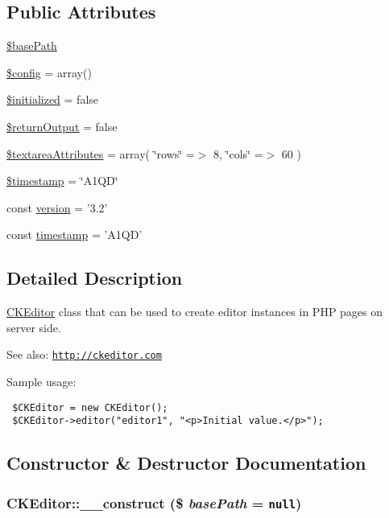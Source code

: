 \subsection*{Public Attributes}
\begin{CompactItemize}
\item 
\hyperlink{classCKEditor_5a276aca7f1883ad38e53e1510846c19}{\$basePath}
\item 
\hyperlink{classCKEditor_54173f65f448c2f1afaade3b6cbe0cb9}{\$config} = array()
\item 
\hyperlink{classCKEditor_bc1853e9e41b16bc32e7d201b9b8f560}{\$initialized} = false
\item 
\hyperlink{classCKEditor_8c1b2e12b69f023e484aab53a960b15c}{\$returnOutput} = false
\item 
\hyperlink{classCKEditor_98970663df037c33f4841cbfbe38e5f9}{\$textareaAttributes} = array( \char`\"{}rows\char`\"{} =$>$ 8, \char`\"{}cols\char`\"{} =$>$ 60 )
\item 
\hyperlink{classCKEditor_6c4f7cd772f7ae66a405ad2d54c33125}{\$timestamp} = \char`\"{}A1QD\char`\"{}
\item 
const \hyperlink{classCKEditor_f23ec1a6cfb30139f39bf4ffbc7d36d7}{version} = '3.2'
\item 
const \hyperlink{classCKEditor_25b4e99a756a8c5d1dc101ecccecbcf7}{timestamp} = 'A1QD'
\end{CompactItemize}


\subsection{Detailed Description}
\hyperlink{classCKEditor}{CKEditor} class that can be used to create editor instances in PHP pages on server side. 

\begin{Desc}
\item[See also:]\href{http://ckeditor.com}{\tt http://ckeditor.com}\end{Desc}
Sample usage: 

\begin{Code}\begin{verbatim} $CKEditor = new CKEditor();
 $CKEditor->editor("editor1", "<p>Initial value.</p>");
\end{verbatim}
\end{Code}

 

\subsection{Constructor \& Destructor Documentation}
\hypertarget{classCKEditor_e58532c32cc95a2c2c34c6135024a428}{
\subsubsection[{\_\-\_\-construct}]{\setlength{\rightskip}{0pt plus 5cm}CKEditor::\_\-\_\-construct (\$ {\em basePath} = {\tt null})}}
\label{classCKEditor_e58532c32cc95a2c2c34c6135024a428}


